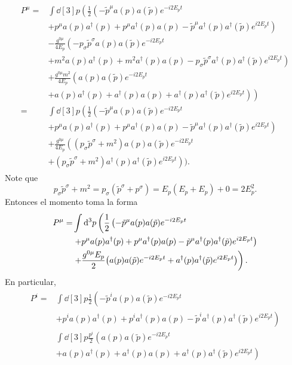 \documentclass{article}
\begin{document}
\begin{align}
\begin{split}
P^\mu=&\int\dd[3]{p}\left(\frac{1}{2}\left(-\tilde{p}^\mu a(p)a(\tilde{p})e^{-i2E_pt}\right.\right.\\
&\left.+p^\mu a(p)a^\dagger(p)+p^\mu a^\dagger(p)a(p)-\tilde{p}^\mu a^\dagger(p)a^\dagger(\tilde{p})e^{i2E_pt}\right)\\
&-\frac{g^{0\mu}}{4E_p}\left(-p_\sigma \tilde{p}^\sigma a(p)a(\tilde{p})e^{-i2E_pt}\right.\\
&\left.+m^2a(p)a^\dagger(p)+m^2a^\dagger(p)a(p)-p_\sigma \tilde{p}^\sigma a^\dagger(p)a^\dagger(\tilde{p})e^{i2E_pt}\right)\\
&+\frac{g^{0\mu}m^2}{4E_p}\left(a(p)a(\tilde{p})e^{-i2E_pt}\right.\\
&\left.\left.+a(p)a^\dagger(p)+a^\dagger(p)a(p)+a^\dagger(p)a^\dagger(\tilde{p})e^{i2E_pt}\right)\right)\\
=&\int\dd[3]{p}\left(\frac{1}{2}\left(-\tilde{p}^\mu a(p)a(\tilde{p})e^{-i2E_pt}\right.\right.\\
&\left.+p^\mu a(p)a^\dagger(p)+p^\mu a^\dagger(p)a(p)-\tilde{p}^\mu a^\dagger(p)a^\dagger(\tilde{p})e^{i2E_pt}\right)\\
&+\frac{g^{0\mu}}{4E_p}\left((p_\sigma \tilde{p}^\sigma+m^2) a(p)a(\tilde{p})e^{-i2E_pt}\right.\\
&\left.+(p_\sigma \tilde{p}^\sigma+m^2) a^\dagger(p)a^\dagger(\tilde{p})e^{i2E_pt}\right)).
\end{split}
\end{align}
Note que
\begin{equation}
p_\sigma\tilde{p}^\sigma+m^2=p_\sigma(\tilde{p}^\sigma+p^\sigma)=E_p(E_p+E_p)+0=2E_p^2.
\end{equation}
Entonces el momento toma la forma
\begin{align}
\begin{split}
P^\mu=&\int\dd[3]{p}\left(\frac{1}{2}\left(-\tilde{p}^\mu a(p)a(\tilde{p})e^{-i2E_pt}\right.\right.\\
&\left.+p^\mu a(p)a^\dagger(p)+p^\mu a^\dagger(p)a(p)-\tilde{p}^\mu a^\dagger(p)a^\dagger(\tilde{p})e^{i2E_pt}\right)\\
&\left.+\frac{g^{0\mu}E_p}{2}\qty( a(p)a(\tilde{p})e^{-i2E_pt}+a^\dagger(p)a^\dagger(\tilde{p})e^{i2E_pt})\right).
\end{split}
\end{align}
En particular,
\begin{align}
\begin{split}
P^i=&\int\dd[3]{p}\frac{1}{2}\left(-\tilde{p}^i a(p)a(\tilde{p})e^{-i2E_pt}\right.\\
&\left.+p^i a(p)a^\dagger(p)+p^i a^\dagger(p)a(p)-\tilde{p}^i a^\dagger(p)a^\dagger(\tilde{p})e^{i2E_pt}\right)\\
&\int\dd[3]{p}\frac{p^i}{2}\left(a(p)a(\tilde{p})e^{-i2E_pt}\right.\\
&\left.+a(p)a^\dagger(p)+ a^\dagger(p)a(p)+ a^\dagger(p)a^\dagger(\tilde{p})e^{i2E_pt}\right)
\end{split}
\end{align}
\end{document}

